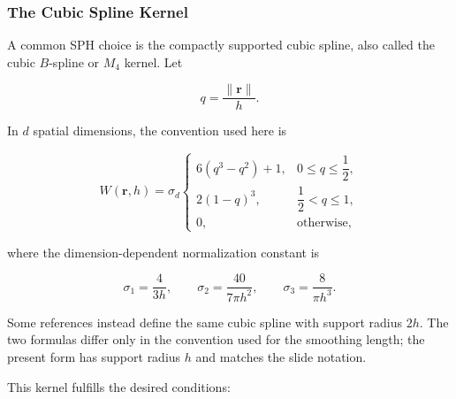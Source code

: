 \documentclass[11pt]{article}
\begin{document}
\subsubsection{The Cubic Spline Kernel}

A common SPH choice is the compactly supported cubic spline, also called the
cubic $B$-spline or $M_4$ kernel. Let

\begin{equation}
    q = \frac{\lVert\mathbf{r}\rVert}{h}.
\end{equation}

In $d$ spatial dimensions, the convention used here is

\begin{equation}
    W(\mathbf{r},h) = \sigma_d
    \begin{cases}
        6(q^3-q^2)+1,
            & 0 \leq q \leq \dfrac{1}{2}, \\
        2(1-q)^3,
            & \dfrac{1}{2} < q \leq 1, \\
        0,
            & \text{otherwise},
    \end{cases}
\end{equation}

where the dimension-dependent normalization constant is

\begin{equation}
    \sigma_1 = \frac{4}{3h},
    \qquad
    \sigma_2 = \frac{40}{7\pi h^2},
    \qquad
    \sigma_3 = \frac{8}{\pi h^3}.
\end{equation}

Some references instead define the same cubic spline with support radius
$2h$. The two formulas differ only in the convention used for the smoothing
length; the present form has support radius $h$ and matches the slide notation.

This kernel fulfills the desired conditions:
\end{document}
